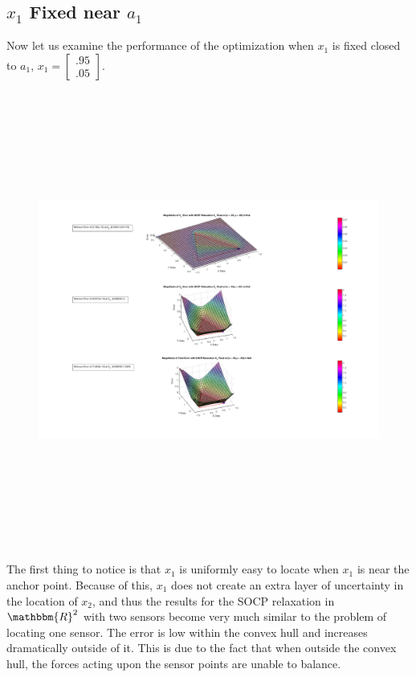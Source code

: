 \documentclass{article} %
\newcommand{\R}{\mathbbm{R}}
\begin{document}
\begin{itemize}
\subsection*{$x_1$ Fixed near $a_1$}


Now let us examine the performance of the optimization when $x_1$ is fixed closed to $a_1$, $x_1 = \begin{bmatrix} .95 \\ .05 \end{bmatrix}$. 

\begin{figure}[H]
\centering
\includegraphics[width=\textwidth,height=15cm]{SOCP_NEAR_A1.png}
\end{figure}

The first thing to notice is that $x_1$ is uniformly easy to locate when $x_1$ is near the anchor point. Because of this, $x_1$ does not create an extra layer of uncertainty in the location of $x_2$, and thus the results for the SOCP relaxation in $\R^2$ with two sensors become very much similar to the problem of locating one sensor. The error is low within the convex hull and increases dramatically outside of it. This is due to the fact that when outside the convex hull, the forces acting upon the sensor points are unable to balance. 





\end{itemize}
\end{document}
